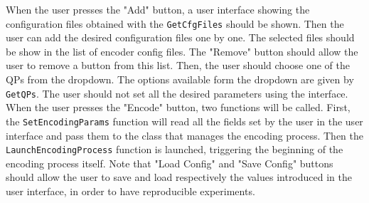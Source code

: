 \documentclass{article}
\begin{document}

    
    
    
    

When the user presses the "Add" button, a user interface showing the configuration files obtained with the \texttt{GetCfgFiles} should be shown. Then the user can add the desired configuration files one by one. The selected files should be show in the list of encoder config files. The "Remove" button should allow the user to remove a button from this list. Then, the user should choose one of the QPs from the dropdown. The options available form the dropdown are given by \texttt{GetQPs}. The user should not set all the desired parameters using the interface. When the user presses the "Encode" button, two functions will be called. First, the \texttt{SetEncodingParams} function will read all the fields set by the user in the user interface and pass them to the class that manages the encoding process. Then the \texttt{LaunchEncodingProcess} function is launched, triggering the beginning of the encoding process itself. Note that "Load Config" and "Save Config" buttons should allow the user to save and load respectively the values introduced in the user interface, in order to have reproducible experiments.
\end{document}
